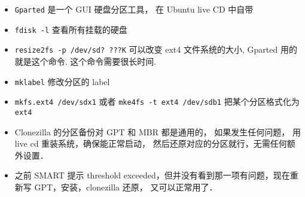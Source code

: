 
\begin{issues}
\issueDraft
\end{issues}

\begin{itemize}
\item \verb|Gparted| 是一个 GUI 硬盘分区工具， 在 Ubuntu live CD 中自带
\item \verb|fdisk -l| 查看所有挂载的硬盘
\item \verb|resize2fs -p /dev/sd? ???K| 可以改变 ext4 文件系统的大小, Gparted 用的就是这个命令. 这个命令需要很长时间.
\item \verb|mklabel| 修改分区的 label
\item \verb|mkfs.ext4 /dev/sdx1| 或者 \verb|mke4fs -t ext4 /dev/sdb1| 把某个分区格式化为 \verb|ext4|
\item Clonezilla 的分区备份对 GPT 和 MBR 都是通用的， 如果发生任何问题， 用 live cd 重装系统，确保能正常启动， 然后还原对应的分区就行，无需任何额外设置．
\item 之前 SMART 提示 threshold exceeded，但并没有看到那一项有问题，现在重新写 GPT，安装，clonezilla 还原， 又可以正常用了．
\end{itemize}
